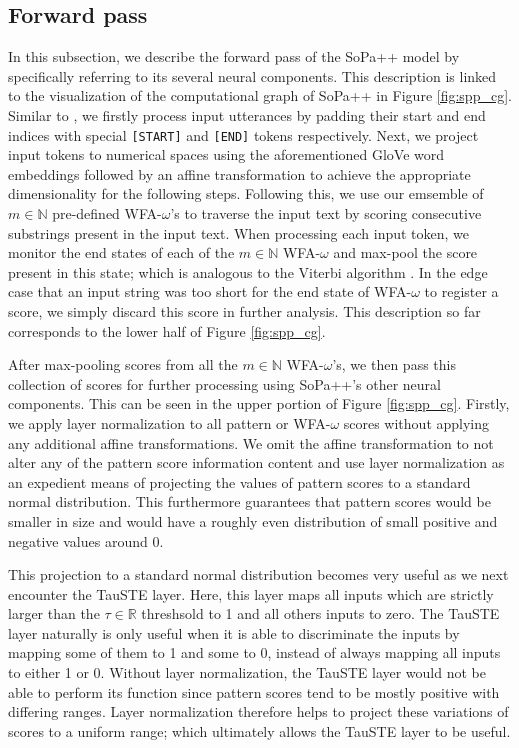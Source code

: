 \subsection{Forward pass}

In this subsection, we describe the forward pass of the SoPa++ model by
specifically referring to its several neural components. This description is
linked to the visualization of the computational graph of SoPa++ in Figure
\ref{fig:spp_cg}. Similar to \citet{schwartz2018sopa}, we firstly process input
utterances by padding their start and end indices with special \texttt{[START]}
and \texttt{[END]} tokens respectively. Next, we project input tokens to
numerical spaces using the aforementioned GloVe word embeddings followed by an
affine transformation to achieve the appropriate dimensionality for the
following steps. Following this, we use our emsemble of $m \in \mathbb{N}$
pre-defined WFA-$\omega$'s to traverse the input text by scoring consecutive
substrings present in the input text. When processing each input token, we
monitor the end states of each of the $m \in \mathbb{N}$ WFA-$\omega$ and
max-pool the score present in this state; which is analogous to the Viterbi
algorithm \citep{viterbi1967error}. In the edge case that an input string was
too short for the end state of WFA-$\omega$ to register a score, we simply
discard this score in further analysis. This description so far corresponds to
the lower half of Figure \ref{fig:spp_cg}.

After max-pooling scores from all the $m \in \mathbb{N}$ WFA-$\omega$'s, we
then pass this collection of scores for further processing using SoPa++'s other
neural components. This can be seen in the upper portion of Figure
\ref{fig:spp_cg}. Firstly, we apply layer normalization \citep{ba2016layer} to
all pattern or WFA-$\omega$ scores without applying any additional affine
transformations. We omit the affine transformation to not alter any of the
pattern score information content and use layer normalization as an expedient
means of projecting the values of pattern scores to a standard normal
distribution. This furthermore guarantees that pattern scores would be
smaller in size and would have a roughly even distribution of small positive and
negative values around 0.

This projection to a standard normal distribution becomes very useful as we next
encounter the TauSTE layer. Here, this layer maps all inputs which are strictly
larger than the $\tau \in \mathbb{R}$ threshsold to 1 and all others inputs to
zero. The TauSTE layer naturally is only useful when it is able to discriminate
the inputs by mapping some of them to 1 and some to 0, instead of always mapping
all inputs to either 1 or 0. Without layer normalization, the TauSTE layer would
not be able to perform its function since pattern scores tend to be mostly
positive with differing ranges. Layer normalization therefore helps to project
these variations of scores to a uniform range; which ultimately allows the
TauSTE layer to be useful.


